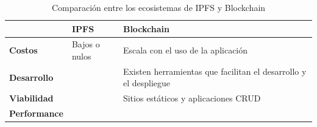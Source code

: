 \setlength\tabcolsep{1pt}
\begin{table}[H]
    \centering
    \begin{tabular}{||m{7em}|m{14em}|m{14em}||}
    \hline
     & \textbf{IPFS} & \textbf{Blockchain} \\
    \hline\hline
    \textbf{Costos} & Bajos o nulos & Escala con el uso de la aplicación \\
    \hline
    \textbf{Desarrollo} &  & Existen herramientas que facilitan el desarrollo y el despliegue \\
    \hline
    \textbf{Viabilidad} & & Sitios estáticos y aplicaciones CRUD \\
    \hline
    \textbf{Performance} & & \\
    \hline
    \end{tabular}
    \caption{Comparación entre los ecosistemas de IPFS y Blockchain}
\end{table}

